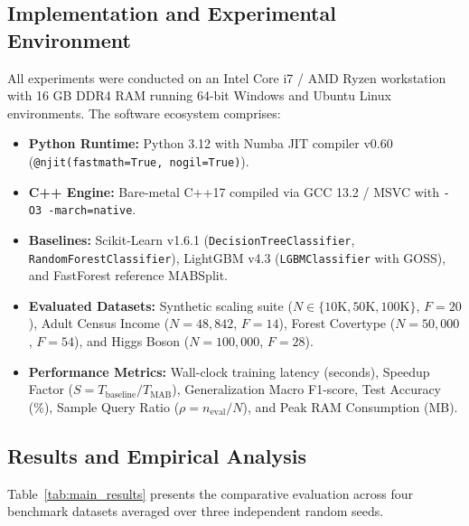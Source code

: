 \documentclass{article}
\begin{document}
	\subsection{Implementation and Experimental Environment}
	All experiments were conducted on an Intel Core i7 / AMD Ryzen workstation with 16 GB DDR4 RAM running 64-bit Windows and Ubuntu Linux environments. The software ecosystem comprises:
	\begin{itemize}
		\item \textbf{Python Runtime:} Python 3.12 with Numba JIT compiler v0.60 (\texttt{@njit(fastmath=True, nogil=True)}).
		\item \textbf{C++ Engine:} Bare-metal C++17 compiled via GCC 13.2 / MSVC with \texttt{-O3 -march=native}.
		\item \textbf{Baselines:} Scikit-Learn v1.6.1 (\texttt{DecisionTreeClassifier}, \texttt{RandomForestClassifier}), LightGBM v4.3 (\texttt{LGBMClassifier} with GOSS), and FastForest reference MABSplit.
		\item \textbf{Evaluated Datasets:} Synthetic scaling suite ($N \in \{10\text{K}, 50\text{K}, 100\text{K}\}$, $F=20$), Adult Census Income ($N = 48{,}842$, $F=14$), Forest Covertype ($N = 50{,}000$, $F=54$), and Higgs Boson ($N = 100{,}000$, $F=28$).
		\item \textbf{Performance Metrics:} Wall-clock training latency (seconds), Speedup Factor ($S = T_{\text{baseline}} / T_{\text{MAB}}$), Generalization Macro F1-score, Test Accuracy (\%), Sample Query Ratio ($\rho = n_{\text{eval}} / N$), and Peak RAM Consumption (MB).
	\end{itemize}

	\subsection{Results and Empirical Analysis}
	Table~\ref{tab:main_results} presents the comparative evaluation across four benchmark datasets averaged over three independent random seeds.
\end{document}
